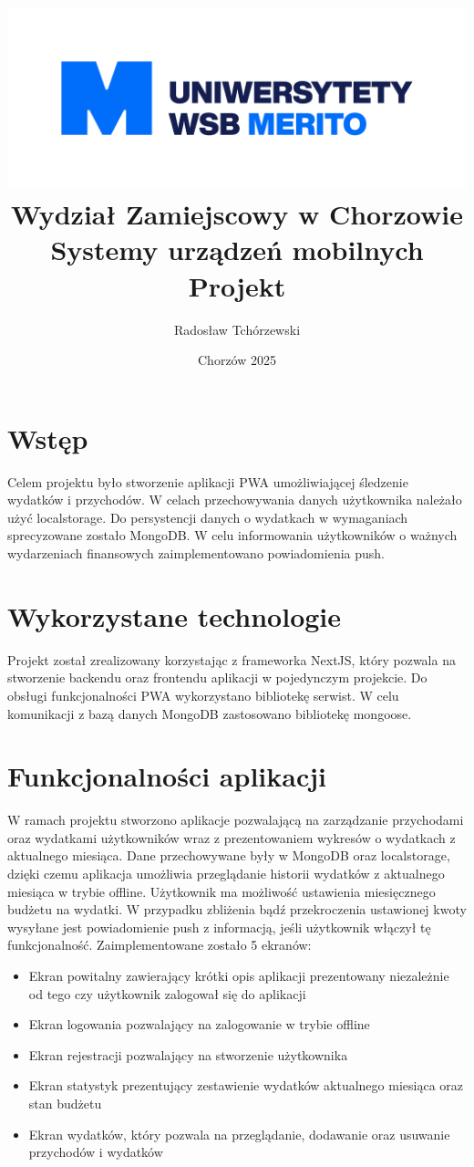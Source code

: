 \documentclass[11pt,titlepage]{article}
\title{
\centering
\includegraphics[scale=0.5]{logo/logo}\\
\textbf{Wydział Zamiejscowy w Chorzowie}\\
\vspace{1cm}
Systemy urządzeń mobilnych \\
\vspace{0.5cm}
Projekt
}
\author{Radosław Tchórzewski}
\date{Chorzów 2025}
\begin{document}
\maketitle


\newpage

\newcommand{\ww}{.25}

\section{Wstęp}
Celem projektu było stworzenie aplikacji PWA umożliwiającej śledzenie wydatków i przychodów. W celach przechowywania danych użytkownika należało użyć localstorage. Do persystencji danych o wydatkach w wymaganiach sprecyzowane zostało MongoDB. W celu informowania użytkowników o ważnych wydarzeniach finansowych zaimplementowano powiadomienia push.

\section{Wykorzystane technologie}
Projekt został zrealizowany korzystając z frameworka NextJS, który pozwala na stworzenie backendu oraz frontendu aplikacji w pojedynczym projekcie. Do obsługi funkcjonalności PWA wykorzystano bibliotekę serwist. W celu komunikacji z bazą danych MongoDB zastosowano bibliotekę mongoose.

\section{Funkcjonalności aplikacji}
W ramach projektu stworzono aplikacje pozwalającą na zarządzanie przychodami oraz wydatkami użytkowników wraz z prezentowaniem wykresów o wydatkach z aktualnego miesiąca. Dane przechowywane były w MongoDB oraz localstorage, dzięki czemu aplikacja umożliwia przeglądanie historii wydatków z aktualnego miesiąca w trybie offline. Użytkownik ma możliwość ustawienia miesięcznego budżetu na wydatki. W przypadku zbliżenia bądź przekroczenia ustawionej kwoty wysyłane jest powiadomienie push z informacją, jeśli użytkownik włączył tę funkcjonalność. 
Zaimplementowane zostało 5 ekranów:

\begin{itemize}
  \item Ekran powitalny zawierający krótki  opis aplikacji prezentowany niezależnie od tego czy użytkownik zalogował się do aplikacji
  \item Ekran logowania pozwalający na zalogowanie w trybie offline
  \item Ekran rejestracji pozwalający na stworzenie użytkownika
  \item Ekran statystyk prezentujący zestawienie wydatków aktualnego miesiąca oraz stan budżetu
  \item Ekran wydatków, który pozwala na przeglądanie, dodawanie oraz usuwanie przychodów i wydatków
\end{itemize}
\end{document}
